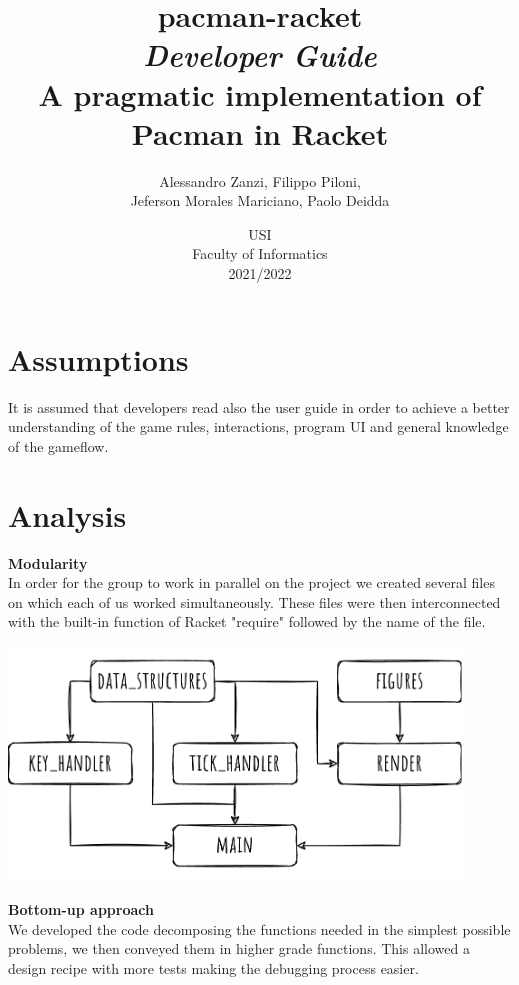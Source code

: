 \documentclass{article}
\title{
    \textbf{pacman-racket} \\
    \textit{Developer Guide}\\
    A pragmatic implementation of Pacman in Racket
}
\author{
    Alessandro Zanzi,
    Filippo Piloni,\\
    Jeferson Morales Mariciano,
    Paolo Deidda
}
\date{
    USI \\
    Faculty of Informatics \\
    [\baselineskip]  2021/2022
}
\begin{document}
\begin{titlepage}
\maketitle  
\thispagestyle{empty}
\end{titlepage}
\tableofcontents
\clearpage
\section{Assumptions}
It is assumed that developers read also the user guide in order to achieve a better understanding of the game rules, interactions, program UI and general knowledge of the gameflow.

\section{Analysis}

\hspace{0.5cm}\textbf{Modularity}\\
 In order for the group to work in parallel on the project we created several files on which each of us worked simultaneously. These files were then interconnected with the built-in function of Racket "require" followed by the name of the file.

\begin{center}
 \includegraphics[width=12cm]{images/dependency_tree.png}
\end{center}
 
\textbf{Bottom-up approach}\\
We developed the code decomposing the functions needed in the simplest possible problems, we then conveyed them in higher grade functions. This allowed a design recipe with more tests making the debugging process easier.
 
\end{document}
